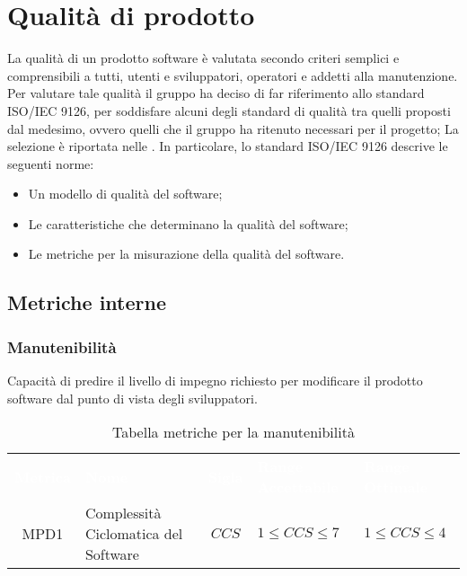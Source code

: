 \section{Qualità di prodotto}
La qualità di un prodotto software è valutata secondo criteri semplici e comprensibili a tutti, utenti e sviluppatori, operatori e addetti alla manutenzione.
Per valutare tale qualità il gruppo \Gruppo{} ha deciso di far riferimento allo standard ISO/IEC 9126, per soddisfare alcuni degli standard di qualità tra quelli proposti dal medesimo, ovvero quelli che il gruppo ha ritenuto necessari per il progetto; La selezione è riportata nelle \NdP{}. In particolare, lo standard ISO/IEC 9126 descrive le seguenti norme:
\begin{itemize}
    \item Un modello di qualità del software; 
    \item Le caratteristiche che determinano la qualità del software;
    \item Le metriche per la misurazione della qualità del software.
\end{itemize}

\subsection{Metriche interne}

\subsubsection{Manutenibilità} 
Capacità di predire il livello di impegno richiesto per modificare il prodotto software dal punto di vista degli sviluppatori.   
  \renewcommand{\arraystretch}{1.5}      
\begin{longtable}{ c C{4cm} c C{3.5cm} C{3.5cm}}
	\caption{Tabella metriche per la manutenibilità}\\
	\textcolor{white}{\textbf{Metrica}} & \textcolor{white}{\textbf{Nome}} & \textcolor{white}{\textbf{Sigla}} & \textcolor{white}{\textbf{Range Accettabile}} & \textcolor{white}{\textbf{Range Ottimale}}\\
	MPD1 & Complessità Ciclomatica del Software & $CCS $ & $1 \leq CCS \leq 7 $ & $1 \leq CCS \leq 4$\\
\end{longtable}
              
